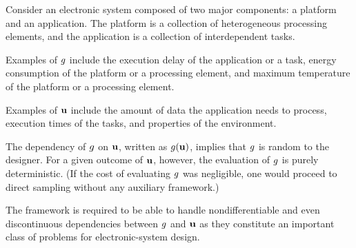 Consider an electronic system composed of two major components: a platform and
an application. The platform is a collection of heterogeneous processing
elements, and the application is a collection of interdependent tasks.

 Examples of $g$ include the execution delay of the application or
a task, energy consumption of the platform or a processing element, and maximum
temperature of the platform or a processing element.

 Examples of $\mathbf{u}$ include the amount of data the
application needs to process, execution times of the tasks, and properties of
the environment.

 The
dependency of $g$ on $\mathbf{u}$, written as $g(\mathbf{u})$, implies that $g$ is random
to the designer. For a given outcome of $\mathbf{u}$, however, the evaluation of $g$
is purely deterministic.  (If the cost of evaluating $g$ was negligible, one
would proceed to direct sampling without any auxiliary framework.)

 The framework is required to be able to handle
nondifferentiable and even discontinuous dependencies between $g$ and $\mathbf{u}$ as
they constitute an important class of problems for electronic-system design.
